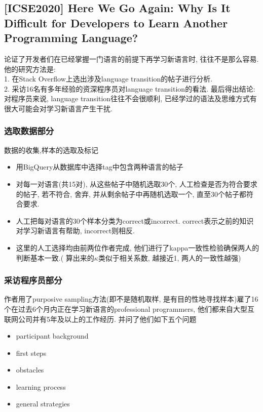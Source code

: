\subsection{[ICSE2020] Here We Go Again: Why Is It Diﬀicult for Developers to Learn Another Programming Language?}

\label{sec:icse2020crosslanginterference}

\cite{shrestha2020crosslanginterference} 论证了开发者们在已经掌握一门语言的前提下再学习新语言时, 往往不是那么容易. 他的研究方法是:\\
1. 在Stack Overflow上选出涉及language transition的帖子进行分析. \\
2. 采访16名有多年经验的资深程序员对language transition的看法. 最后得出结论: 对程序员来说, language transition往往不会很顺利, 已经学过的语法及思维方式有很大可能会对学习新语言产生干扰.

\subsubsection{选取数据部分}

数据的收集,样本的选取及标记

\begin{itemize}
    \item 用BigQuery从数据库中选择tag中包含两种语言的帖子
    \item 对每一对语言(共15对), 从这些帖子中随机选取30个, 人工检查是否为符合要求的帖子, 若不符合, 舍弃, 并从剩余帖子中再随机选取一个, 直至30个帖子都符合要求.
    \item 人工把每对语言的30个样本分类为correct或incorrect. correct表示之前的知识对学习新语言有帮助, incorrect则相反.
    \item 这里的人工选择均由前两位作者完成, 他们进行了kappa一致性检验确保两人的判断基本一致.( 算出来的$\kappa$类似于相关系数, 越接近1, 两人的一致性越强)
\end{itemize}

\subsubsection{采访程序员部分}
作者用了purposive sampling方法(即不是随机取样, 是有目的性地寻找样本)雇了16个在过去6个月内正在学习新语言的professional programmers, 他们都来自大型互联网公司并有5年及以上的工作经历. 并问了他们如下五个问题

\begin{itemize}
    \item participant background
    \item first steps
    \item obstacles
    \item learning process
    \item general strategies
\end{itemize}

